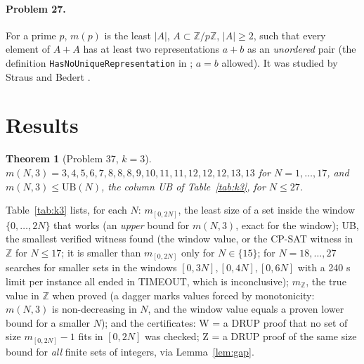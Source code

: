 \documentclass[11pt]{article}
\newtheorem{theorem}{Theorem}
\begin{document}
\paragraph{Problem 27.} For a prime $p$, $m(p)$ is the least $|A|$, $A\subset\mathbb Z/p\mathbb Z$, $|A|\ge2$, such that every element of $A+A$ has at least two representations $a+b$ as an \emph{unordered} pair (the definition \texttt{HasNoUniqueRepresentation} in \cite{fc}; $a=b$ allowed). It was studied by Straus and Bedert \cite{bedert}.

\section{Results}
\begin{theorem}[Problem 37, $k=3$]\label{thm:main}
$m(N,3)=3,4,5,6,7,8,8,8,9,10,11,11,12,12,12,13,13$ for $N=1,\dots,17$, and $m(N,3)\le \mathrm{UB}(N)$, the column UB of Table~\ref{tab:k3}, for $N\le 27$.
\end{theorem}
Table~\ref{tab:k3} lists, for each $N$: $m_{[0,2N]}$, the least size of a set inside the window $\{0,\dots,2N\}$ that works (an \emph{upper} bound for $m(N,3)$, exact for the window); UB, the smallest verified witness found (the window value, or the CP-SAT witness in $\mathbb Z$ for $N\le17$; it is smaller than $m_{[0,2N]}$ only for $N\in\{15\}$; for $N=18,\dots,27$ searches for smaller sets in the windows $[0,3N],[0,4N],[0,6N]$ with a 240 s limit per instance all ended in TIMEOUT, which is inconclusive); $m_{\mathbb Z}$, the true value in $\mathbb Z$ when proved (a dagger marks values forced by monotonicity: $m(N,3)$ is non-decreasing in $N$, and the window value equals a proven lower bound for a smaller $N$); and the certificates: W = a DRUP proof that no set of size $m_{[0,2N]}-1$ fits in $[0,2N]$ was checked; Z = a DRUP proof of the same size bound for \emph{all} finite sets of integers, via Lemma~\ref{lem:gap}.
\end{document}
